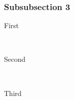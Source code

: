 \documentclass[12pt]{article} %
\begin{document}
\lipsum[6] %
\lipsum[7-8] %


\subsubsection{Subsubsection 3} %

\begin{description} %

\item[First] \hfill \\
\lipsum[9] %

\item[Second] \hfill \\
\lipsum[10] %

\item[Third] \hfill \\
\lipsum[11] %

\end{description} 






\end{document}

